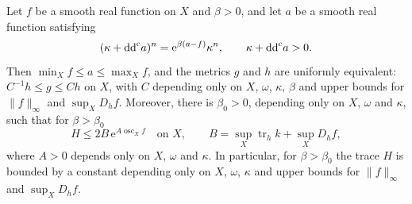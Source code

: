 \begin{lemma}\label{lem:penalized-equation-trace}
Let $f$ be a smooth real function on $X$ and $\beta>0$, and let $a$ be a smooth real function satisfying
\begin{equation}\label{eq:penalized-kahler-equation}
 (\kappa+\mathrm{dd}^{\mathrm{c}} a)^n=\mathrm e^{\beta(a-f)}\kappa^n,
 \qquad \kappa+\mathrm{dd}^{\mathrm{c}} a>0.
\end{equation}
Then $\min_Xf\leq a\leq\max_Xf$, and the metrics $g$ and $h$ are uniformly equivalent: $C^{-1}h\leq g\leq Ch$ on $X$, with $C$ depending only on $X$, $\omega$, $\kappa$, $\beta$ and upper bounds for $\|f\|_\infty$ and $\sup_XD_hf$. Moreover, there is $\beta_0>0$, depending only on $X$, $\omega$ and $\kappa$, such that for $\beta>\beta_0$
\[
 H\leq2B\,\mathrm e^{A\operatorname{osc}_Xf}\quad\text{on }X,
 \qquad B=\sup_X\operatorname{tr}_hk+\sup_XD_hf,
\]
where $A>0$ depends only on $X$, $\omega$ and $\kappa$. In particular, for $\beta>\beta_0$ the trace $H$ is bounded by a constant depending only on $X$, $\omega$, $\kappa$ and upper bounds for $\|f\|_\infty$ and $\sup_XD_hf$.
\end{lemma}
